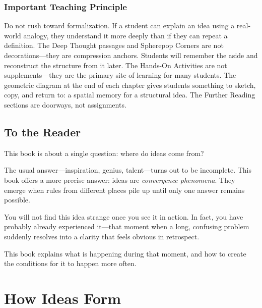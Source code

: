 \documentclass[11pt]{book}
\theoremstyle{definition}
\theoremstyle{remark}
\begin{document}
\section*{Important Teaching Principle}

Do not rush toward formalization. If a student can explain an idea using
a real-world analogy, they understand it more deeply than if they can
repeat a definition. The Deep Thought passages and Spherepop Corners
are not decorations---they are compression anchors. Students will
remember the aside and reconstruct the structure from it later. The
Hands-On Activities are not supplements---they are the primary site of
learning for many students. The geometric diagram at the end of each
chapter gives students something to sketch, copy, and return to: a
spatial memory for a structural idea. The Further Reading sections are
doorways, not assignments.

\chapter*{To the Reader}

This book is about a single question: where do ideas come from?

The usual answer---inspiration, genius, talent---turns out to be
incomplete. This book offers a more precise answer: ideas are
\emph{convergence phenomena}. They emerge when rules from different
places pile up until only one answer remains possible.

You will not find this idea strange once you see it in action. In fact,
you have probably already experienced it---that moment when a long,
confusing problem suddenly resolves into a clarity that feels obvious
in retrospect.

This book explains what is happening during that moment, and how to
create the conditions for it to happen more often.

\part{How Ideas Form}

\end{document}
